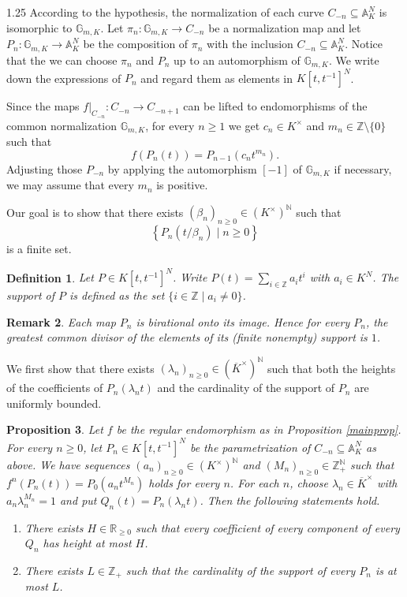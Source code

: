 \documentclass[12pt]{article}
\newtheorem{definition}{Definition}[section]
\newtheorem{proposition}[definition]{Proposition}
\newtheorem{remark}[definition]{Remark}
\begin{document}
\begin{spacing}{1.25}
According to the hypothesis, the normalization of each curve $C_{-n}\subseteq\mathbb{A}_K^N$ is isomorphic to $\mathbb{G}_{m,K}$. Let $\pi_n\colon\mathbb{G}_{m,K}\to C_{-n}$ be a normalization map and let $P_n\colon\mathbb{G}_{m,K}\to\mathbb{A}_K^N$ be the composition of $\pi_n$ with the inclusion $C_{-n}\subseteq\mathbb{A}_K^N$. Notice that the we can choose $\pi_n$ and $P_n$ up to an automorphism of $\mathbb{G}_{m,K}$. We write down the expressions of $P_n$ and regard them as elements in $K[t,t^{-1}]^N$.

Since the maps $f|_{C_{-n}}\colon C_{-n}\to C_{-n+1}$ can be lifted to endomorphisms of the common normalization $\mathbb{G}_{m,K}$, for every $n\geq1$ we get $c_n\in K^{\times}$ and $m_n\in\mathbb{Z}\setminus\{0\}$ such that
$$
f(P_n(t))=P_{n-1}(c_nt^{m_n}).
$$
Adjusting those $P_{-n}$ by applying the automorphism $[-1]$ of $\mathbb{G}_{m,K}$ if necessary, we may assume that every $m_n$ is positive.

Our goal is to show that there exists $(\beta_n)_{n\geq0}\in(K^{\times})^{\mathbb{N}}$ such that
$$
\left\{P_n(t/\beta_n)\mid n\geq0\right\}
$$
is a finite set.

\begin{definition}\label{support}
Let $P\in K[t,t^{-1}]^N$. Write $P(t)=\sum\limits_{i\in\mathbb{Z}}a_it^i$ with $a_i\in K^N$. The \emph{support} of $P$ is defined as the set $\{i\in\mathbb{Z}\mid a_i\neq0\}$.
\end{definition}

\begin{remark}\label{supprmk}
Each map $P_n$ is birational onto its image. Hence for every $P_n$, the greatest common divisor of the elements of its (finite nonempty) support is $1$.
\end{remark}

We first show that there exists $(\lambda_n)_{n\geq0}\in(\overline{K}^{\times})^{\mathbb{N}}$ such that both the heights of the coefficients of $P_n(\lambda_nt)$ and the cardinality of the support of $P_n$ are uniformly bounded.

\begin{proposition}\label{bdhtsup}
Let $f$ be the regular endomorphism as in Proposition \ref{mainprop}. For every $n\geq0$, let $P_n\in K[t,t^{-1}]^N$ be the parametrization of $C_{-n}\subseteq\mathbb{A}_K^N$ as above. We have sequences $(a_n)_{n\geq0}\in(K^{\times})^{\mathbb{N}}$ and $(M_n)_{n\geq0}\in\mathbb{Z}_+^{\mathbb{N}}$ such that $f^n(P_n(t))=P_0(a_nt^{M_n})$ holds for every $n$. For each $n$, choose $\lambda_n\in\overline{K}^{\times}$ with $a_n\lambda_n^{M_n}=1$ and put $Q_n(t)=P_n(\lambda_nt)$. Then the following statements hold.
\begin{enumerate}
\item
There exists $H\in\mathbb{R}_{\geq0}$ such that every coefficient of every component of every $Q_n$ has height at most $H$.
\item
There exists $L\in\mathbb{Z}_+$ such that the cardinality of the support of every $P_n$ is at most $L$.
\end{enumerate}
\end{proposition}


\end{spacing}
\end{document}
